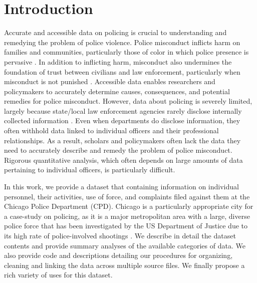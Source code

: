 

\section{Introduction} \label{sec:intro}
Accurate and accessible data on policing is crucial to understanding and
remedying the problem of police violence. Police misconduct inflicts harm on
families and communities, particularly those of color in which police presence
is pervasive \cite{Alang17}. In addition to inflicting harm, misconduct also
undermines the foundation of trust between civilians and law enforcement,
particularly when misconduct is not punished \cite{Desmond16}. Accessible data
enables researchers and policymakers to accurately determine causes,
consequences, and potential remedies for police misconduct.
However, data about policing is severely limited, largely because state/local law
enforcement agencies rarely disclose internally collected information
\cite{Jackman21}. Even when departments do disclose information, they often
withhold data linked to individual officers and their professional
relationships.  As a result, scholars and policymakers often
lack the data they need to accurately describe and remedy the problem of police
misconduct.  Rigorous quantitative analysis, which often depends on large
amounts of data pertaining to individual officers, is particularly difficult.

In this work, we provide a dataset that containing information on individual
personnel, their activities, use of force, and complaints filed against them at
the Chicago Police Department (CPD).  Chicago is a particularly appropriate
city for a case-study on policing, as it is a major metropolitan area with a
large, diverse police force that has been investigated by the US Department of
Justice due to its high rate of police-involved shootings \cite{DoJ17}.  We
describe in detail the dataset contents and provide summary analyses of the
available categories of data. We also provide code and descriptions detailing
our procedures for organizing, cleaning and linking the data across multiple
source files. We finally propose a rich variety of uses for this dataset.

